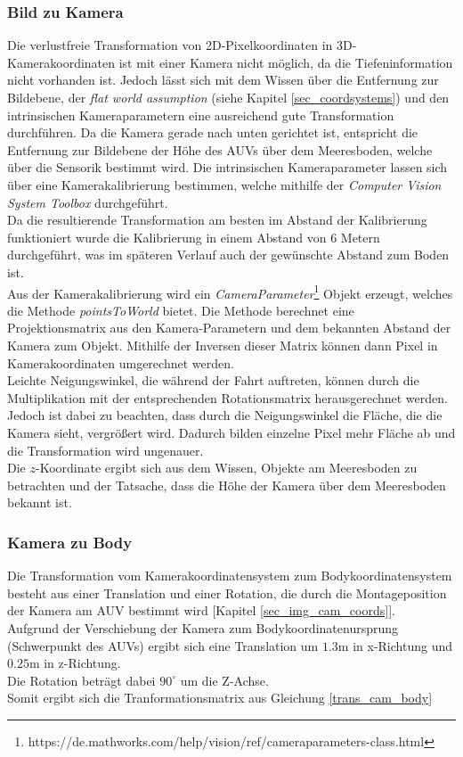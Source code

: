 \subsubsection{Bild zu Kamera}
\label{section_PicToCam}
Die verlustfreie Transformation von 2D-Pixelkoordinaten in 3D-Kamerakoordinaten ist mit einer Kamera nicht möglich, da die Tiefeninformation nicht vorhanden ist. Jedoch lässt sich mit dem Wissen über die Entfernung zur Bildebene, der \textit{flat world assumption} (siehe Kapitel \ref{sec_coordsystems}) und den intrinsischen Kameraparametern eine ausreichend gute Transformation durchführen. Da die Kamera gerade nach unten gerichtet ist, entspricht die Entfernung zur Bildebene der Höhe des AUVs über dem Meeresboden, welche über die Sensorik bestimmt wird. Die intrinsischen Kameraparameter lassen sich über eine Kamerakalibrierung bestimmen, welche mithilfe der \matlab \textit{Computer Vision System Toolbox} durchgeführt.\\
Da die resultierende Transformation am besten im Abstand der Kalibrierung funktioniert wurde die Kalibrierung in einem Abstand von 6 Metern durchgeführt, was im späteren Verlauf auch der gewünschte Abstand zum Boden ist.\\
Aus der Kamerakalibrierung wird ein \textit{CameraParameter}\footnote{https://de.mathworks.com/help/vision/ref/cameraparameters-class.html} Objekt erzeugt, welches die Methode \textit{pointsToWorld} bietet. Die Methode berechnet eine Projektionsmatrix aus den Kamera-Parametern und dem bekannten Abstand der Kamera zum Objekt. Mithilfe der Inversen dieser Matrix können dann Pixel in Kamerakoordinaten umgerechnet werden.\\
Leichte Neigungswinkel, die während der Fahrt auftreten, können durch die Multiplikation mit der entsprechenden Rotationsmatrix herausgerechnet werden. Jedoch ist dabei zu beachten, dass durch die Neigungswinkel die Fläche, die die Kamera sieht, vergrößert wird. Dadurch bilden einzelne Pixel mehr Fläche ab und die Transformation wird ungenauer.\\
Die $z$-Koordinate ergibt sich aus dem Wissen, Objekte am Meeresboden zu betrachten und der Tatsache, dass die Höhe der Kamera über dem Meeresboden bekannt ist.

\subsubsection{Kamera zu Body}
Die Transformation vom Kamerakoordinatensystem zum Bodykoordinatensystem besteht aus einer Translation und einer Rotation, die durch die Montageposition der Kamera am AUV bestimmt wird [Kapitel \ref{sec_img_cam_coords}].\\
Aufgrund der Verschiebung der Kamera zum Bodykoordinatenursprung (Schwerpunkt des AUVs) ergibt sich eine Translation um $1.3$m in x-Richtung und $0.25$m in z-Richtung.\\
Die Rotation beträgt dabei $90^\circ$ um die Z-Achse.\\
Somit ergibt sich die Tranformationsmatrix aus Gleichung \ref{trans_cam_body}\\

